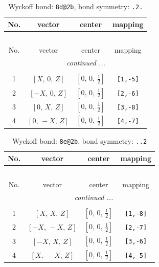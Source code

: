 \documentclass[fleqn,8pt]{jsarticle}
\begin{document}
\begin{longtable}{cccc}
\caption{Wyckoff bond: {\tt 8d@2b}, bond symmetry: {\tt .2.}}
 \\
 \hline \hline
No. & vector & center & mapping \\ \hline \endfirsthead

\multicolumn{3}{l}{\tablename\ \thetable{}} \\
 \hline \hline
No. & vector & center & mapping \\ \hline \endhead

 \hline \hline
\multicolumn{3}{r}{\footnotesize\it continued ...} \\ \endfoot

 \hline \hline
\multicolumn{3}{r}{} \\ \endlastfoot

1 & $\left[ X,\, 0,\, Z \right]$ & $\left[ 0,\, 0,\, \frac{1}{2} \right]$ & {\tt [1,-5]} \\ \hline
2 & $\left[ - X,\, 0,\, Z \right]$ & $\left[ 0,\, 0,\, \frac{1}{2} \right]$ & {\tt [2,-6]} \\ \hline
3 & $\left[ 0,\, X,\, Z \right]$ & $\left[ 0,\, 0,\, \frac{1}{2} \right]$ & {\tt [3,-8]} \\ \hline
4 & $\left[ 0,\, - X,\, Z \right]$ & $\left[ 0,\, 0,\, \frac{1}{2} \right]$ & {\tt [4,-7]} \\
\end{longtable}
\renewcommand{\arraystretch}{1.2}
\begin{longtable}{cccc}
\caption{Wyckoff bond: {\tt 8e@2b}, bond symmetry: {\tt ..2}}
 \\
 \hline \hline
No. & vector & center & mapping \\ \hline \endfirsthead

\multicolumn{3}{l}{\tablename\ \thetable{}} \\
 \hline \hline
No. & vector & center & mapping \\ \hline \endhead

 \hline \hline
\multicolumn{3}{r}{\footnotesize\it continued ...} \\ \endfoot

 \hline \hline
\multicolumn{3}{r}{} \\ \endlastfoot

1 & $\left[ X,\, X,\, Z \right]$ & $\left[ 0,\, 0,\, \frac{1}{2} \right]$ & {\tt [1,-8]} \\ \hline
2 & $\left[ - X,\, - X,\, Z \right]$ & $\left[ 0,\, 0,\, \frac{1}{2} \right]$ & {\tt [2,-7]} \\ \hline
3 & $\left[ - X,\, X,\, Z \right]$ & $\left[ 0,\, 0,\, \frac{1}{2} \right]$ & {\tt [3,-6]} \\ \hline
4 & $\left[ X,\, - X,\, Z \right]$ & $\left[ 0,\, 0,\, \frac{1}{2} \right]$ & {\tt [4,-5]} \\
\end{longtable}
\end{document}
